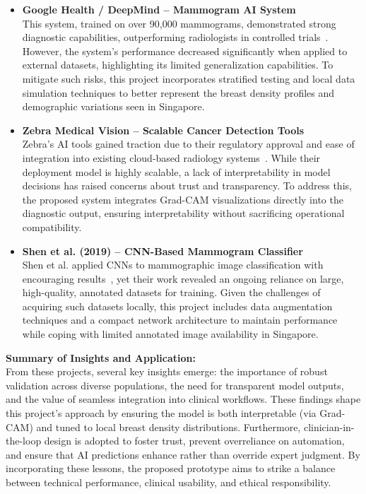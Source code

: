\documentclass[12pt]{article}
\begin{document}
\begin{itemize}
    \item \textbf{Google Health / DeepMind – Mammogram AI System} \\
    This system, trained on over 90{,}000 mammograms, demonstrated strong diagnostic capabilities, outperforming radiologists in controlled trials~\cite{11}. However, the system's performance decreased significantly when applied to external datasets, highlighting its limited generalization capabilities. To mitigate such risks, this project incorporates stratified testing and local data simulation techniques to better represent the breast density profiles and demographic variations seen in Singapore.

    \item \textbf{Zebra Medical Vision – Scalable Cancer Detection Tools} \\
    Zebra’s AI tools gained traction due to their regulatory approval and ease of integration into existing cloud-based radiology systems~\cite{12}. While their deployment model is highly scalable, a lack of interpretability in model decisions has raised concerns about trust and transparency. To address this, the proposed system integrates Grad-CAM visualizations directly into the diagnostic output, ensuring interpretability without sacrificing operational compatibility.

    \item \textbf{Shen et al. (2019) – CNN-Based Mammogram Classifier} \\
    Shen et al. applied CNNs to mammographic image classification with encouraging results~\cite{7}, yet their work revealed an ongoing reliance on large, high-quality, annotated datasets for training. Given the challenges of acquiring such datasets locally, this project includes data augmentation techniques and a compact network architecture to maintain performance while coping with limited annotated image availability in Singapore.
\end{itemize}

\noindent \textbf{Summary of Insights and Application:} \\
From these projects, several key insights emerge: the importance of robust validation across diverse populations, the need for transparent model outputs, and the value of seamless integration into clinical workflows. These findings shape this project’s approach by ensuring the model is both interpretable (via Grad-CAM) and tuned to local breast density distributions. Furthermore, clinician-in-the-loop design is adopted to foster trust, prevent overreliance on automation, and ensure that AI predictions enhance rather than override expert judgment. By incorporating these lessons, the proposed prototype aims to strike a balance between technical performance, clinical usability, and ethical responsibility.
\end{document}
